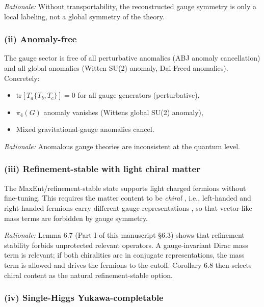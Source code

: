 \emph{Rationale:} Without transportability, the reconstructed gauge symmetry is only a local labeling, not a global symmetry of the theory.

\subsubsection{(ii) Anomaly-free}\label{ii-anomaly-free}

The gauge sector is free of all perturbative anomalies (ABJ anomaly cancellation) and all global anomalies (Witten SU(2) anomaly, Dai-Freed anomalies). Concretely:

\begin{itemize}
\tightlist
\item
  \(\mathrm{tr}[T_a \{T_b, T_c\}] = 0\) for all gauge generators (perturbative),
\item
  \(\pi_4(G)\) anomaly vanishes (Witten\textquotesingle s global SU(2) anomaly),
\item
  Mixed gravitational-gauge anomalies cancel.
\end{itemize}

\emph{Rationale:} Anomalous gauge theories are inconsistent at the quantum level.

\subsubsection{(iii) Refinement-stable with light chiral matter}\label{iii-refinement-stable-with-light-chiral-matter}

The MaxEnt/refinement-stable state supports light charged fermions without fine-tuning. This requires the matter content to be \emph{chiral} , i.e., left-handed and right-handed fermions carry different gauge representations , so that vector-like mass terms are forbidden by gauge symmetry.

\emph{Rationale:} Lemma 6.7 (Part I of this manuscript §6.3) shows that refinement stability forbids unprotected relevant operators. A gauge-invariant Dirac mass term is relevant; if both chiralities are in conjugate representations, the mass term is allowed and drives the fermions to the cutoff. Corollary 6.8 then selects chiral content as the natural refinement-stable option.

\subsubsection{(iv) Single-Higgs Yukawa-completable}\label{iv-single-higgs-yukawa-completable}

